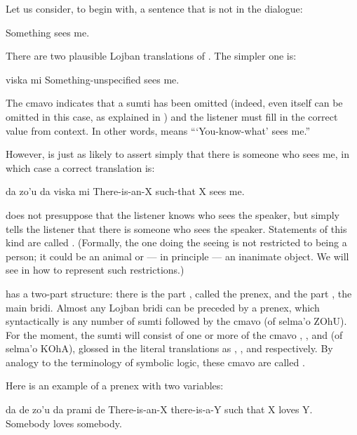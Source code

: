 Let us consider, to begin with, a sentence that is not in
    the dialogue:
\begin{example}
Something sees me.
\end{example}

There are two plausible Lojban translations of . The simpler one is:
\begin{example}
 viska mi\n
Something-unspecified sees me.
\end{example}

The cmavo  indicates that a sumti has been omitted
    (indeed, even  itself can be omitted in this case, as
    explained in ) and the
    listener must fill in the correct value from context. In other
    words,  means ```You-know-what'
    sees me.'' 

However,  is just as likely
    to assert simply that there is someone who sees me, in which
    case a correct translation is:
\begin{example}
da zo'u da viska mi\n
There-is-an-X such-that X sees me.
\end{example}

 does not presuppose that the
    listener knows who sees the speaker, but simply tells the
    listener that there is someone who sees the speaker. Statements
    of this kind are called . (Formally, the
    one doing the seeing is not restricted to being a person; it
    could be an animal or --- in principle --- an inanimate object.
    We will see in  how to represent
    such restrictions.) 

 has a two-part structure:
    there is the part , called the prenex, and the part
    , the main bridi. Almost any Lojban bridi can be
    preceded by a prenex, which syntactically is any number of
    sumti followed by the cmavo  (of selma'o ZOhU). For the
    moment, the sumti will consist of one or more of the cmavo
    , , and  (of selma'o KOhA), glossed in the
    literal translations as , , and  respectively.
    By analogy to the terminology of symbolic logic, these cmavo
    are called .

Here is an example of a prenex with two variables:
\begin{example}
da de zo'u da prami de\n
There-is-an-X there-is-a-Y such that X loves Y.\n
Somebody loves somebody.
\end{example}


